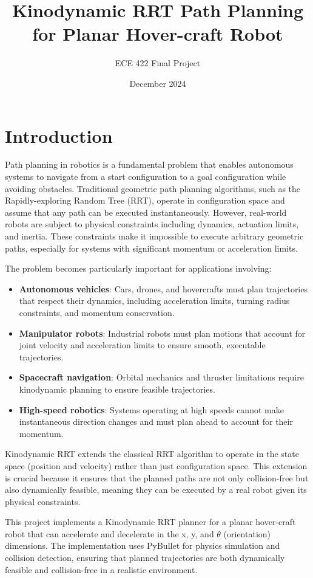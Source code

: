 \documentclass[11pt]{article}
\title{Kinodynamic RRT Path Planning for Planar Hover-craft Robot}
\author{ECE 422 Final Project}
\date{December 2024}
\begin{document}
\maketitle

\section{Introduction}

Path planning in robotics is a fundamental problem that enables autonomous systems to navigate from a start configuration to a goal configuration while avoiding obstacles. Traditional geometric path planning algorithms, such as the Rapidly-exploring Random Tree (RRT), operate in configuration space and assume that any path can be executed instantaneously. However, real-world robots are subject to physical constraints including dynamics, actuation limits, and inertia. These constraints make it impossible to execute arbitrary geometric paths, especially for systems with significant momentum or acceleration limits.

The problem becomes particularly important for applications involving:
\begin{itemize}
    \item \textbf{Autonomous vehicles}: Cars, drones, and hovercrafts must plan trajectories that respect their dynamics, including acceleration limits, turning radius constraints, and momentum conservation.
    \item \textbf{Manipulator robots}: Industrial robots must plan motions that account for joint velocity and acceleration limits to ensure smooth, executable trajectories.
    \item \textbf{Spacecraft navigation}: Orbital mechanics and thruster limitations require kinodynamic planning to ensure feasible trajectories.
    \item \textbf{High-speed robotics}: Systems operating at high speeds cannot make instantaneous direction changes and must plan ahead to account for their momentum.
\end{itemize}

Kinodynamic RRT extends the classical RRT algorithm to operate in the state space (position and velocity) rather than just configuration space. This extension is crucial because it ensures that the planned paths are not only collision-free but also dynamically feasible, meaning they can be executed by a real robot given its physical constraints.

This project implements a Kinodynamic RRT planner for a planar hover-craft robot that can accelerate and decelerate in the x, y, and $\theta$ (orientation) dimensions. The implementation uses PyBullet for physics simulation and collision detection, ensuring that planned trajectories are both dynamically feasible and collision-free in a realistic environment.
\end{document}
